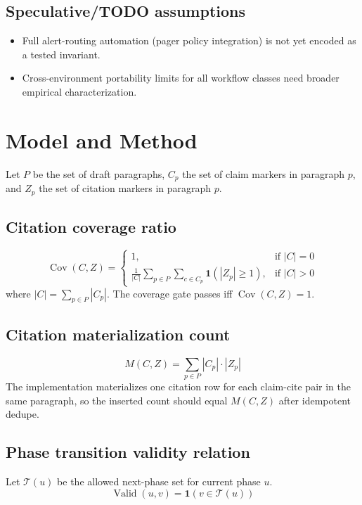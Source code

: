 \documentclass[11pt]{article}
\begin{document}
\subsection*{Speculative/TODO assumptions}
\begin{itemize}
  \item Full alert-routing automation (pager policy integration) is not yet encoded as a tested invariant.
  \item Cross-environment portability limits for all workflow classes need broader empirical characterization.
\end{itemize}

\section{Model and Method}\label{sec:model_method}
Let $P$ be the set of draft paragraphs, $C_p$ the set of claim markers in paragraph $p$, and $Z_p$ the set of citation markers in paragraph $p$.

\subsection{Citation coverage ratio}
\begin{equation}
\operatorname{Cov}(C, Z) =
\begin{cases}
1, & \text{if } |C| = 0\\
\frac{1}{|C|}\sum\limits_{p \in P} \sum\limits_{c \in C_p} \mathbf{1}(|Z_p| \ge 1), & \text{if } |C| > 0
\end{cases}
\label{eq:coverage_ratio}
\end{equation}
where $|C| = \sum_{p \in P}|C_p|$. The coverage gate passes iff $\operatorname{Cov}(C, Z) = 1$.

\subsection{Citation materialization count}
\begin{equation}
M(C, Z) = \sum_{p \in P} |C_p| \cdot |Z_p|
\label{eq:materialization_count}
\end{equation}
The implementation materializes one citation row for each claim-cite pair in the same paragraph, so the inserted count should equal $M(C,Z)$ after idempotent dedupe.

\subsection{Phase transition validity relation}
Let $\mathcal{T}(u)$ be the allowed next-phase set for current phase $u$.
\begin{equation}
\operatorname{Valid}(u, v) = \mathbf{1}(v \in \mathcal{T}(u))
\label{eq:phase_transition_validity}
\end{equation}
\end{document}
